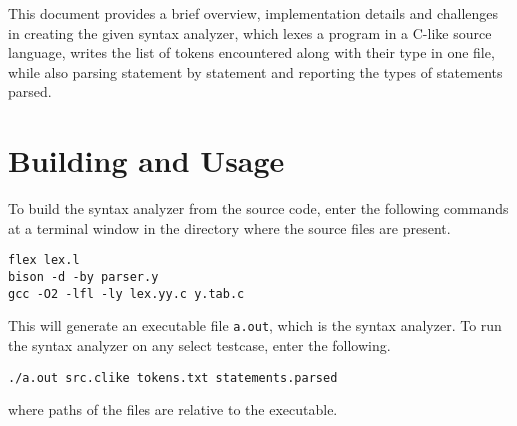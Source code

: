 \documentclass[journal,12pt,twocolumn]{IEEEtran}
\begin{document}
This document provides a brief overview, implementation details and challenges
in creating the given syntax analyzer, which lexes a program in a C-like 
source language, writes the list of tokens encountered along with
their type in one file, while also parsing statement by statement and reporting
the types of statements parsed.

\section{Building and Usage}

To build the syntax analyzer from the source code, enter the following commands 
at a terminal window in the directory where the source files are present.

\begin{lstlisting}
flex lex.l
bison -d -by parser.y
gcc -O2 -lfl -ly lex.yy.c y.tab.c
\end{lstlisting}

This will generate an executable file \texttt{a.out}, which is the syntax
analyzer. To run the syntax analyzer on any select testcase, enter the
following.

\begin{lstlisting}
./a.out src.clike tokens.txt statements.parsed
\end{lstlisting}

where paths of the files are relative to the executable.
\end{document}
